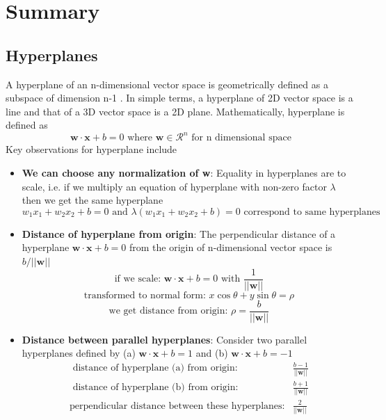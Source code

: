 \documentclass[11pt]{article}
\begin{document}
\section{Summary}
\subsection{Hyperplanes}
A hyperplane of an n-dimensional vector space is geometrically defined as a subspace of dimension n-1 \cite{Hyperplane_def}. In simple terms, a hyperplane of 2D vector space is a line and that of a 3D vector space is a 2D plane. Mathematically, hyperplane is defined as 
\[
\mathbf{w} \cdot \mathbf{x} + b = 0 \text{    where } \mathbf{w} \in \mathcal{R}^n \text{ for n dimensional space}
\]
Key observations for hyperplane include
\begin{itemize}
    \item \textbf{We can choose any normalization of w}: Equality in hyperplanes are to scale, i.e. if we multiply an equation of hyperplane with non-zero factor $\lambda$ then we get the same hyperplane
    \[w_1 x_1 + w_2x_2 +b = 0 \text{  and  } \lambda(w_1 x_1 + w_2x_2 + b) = 0 \text{ correspond to same hyperplanes}\]
    \item \textbf{Distance of hyperplane from origin}: The perpendicular distance of a hyperplane $\mathbf{w \cdot x} + b = 0$ from the origin of n-dimensional vector space is $b/||\mathbf{w}||$
    \[
    \text{if we scale:  } \mathbf{w \cdot x} + b = 0 \text{ with } \frac{1}{||\mathbf{w}||} 
    \]
    \[
    \text{transformed to normal form:  } x \cos \theta + y \sin \theta = \rho
    \]
    \[
    \text{we get distance from origin:   } \rho = \frac{b}{||\mathbf{w}||}
    \]
    \item \textbf{Distance between parallel hyperplanes}: Consider two parallel hyperplanes defined by (a) $\mathbf{w \cdot x} + b = 1$ and (b) $\mathbf{w \cdot x} + b = -1$
    \begin{equation*}
        \begin{split}
            \text{  distance of hyperplane (a) from origin:  }& \frac{b-1}{||\mathbf{w}||}\\
            \text{  distance of hyperplane (b) from origin:   }& \frac{b+1}{||\mathbf{w}||}\\
            \text{perpendicular distance between these hyperplanes:}& \frac{2}{||\mathbf{w}||}
        \end{split}
    \end{equation*}
\end{itemize}
\end{document}
